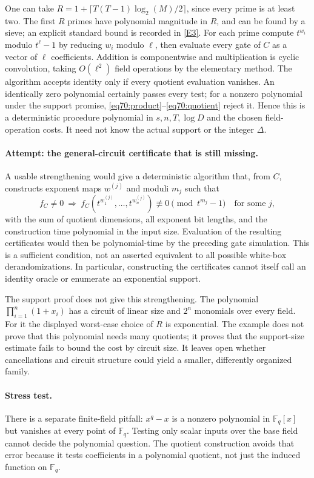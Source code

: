 \documentclass[11pt,a4paper]{article}
\numberwithin{equation}{section}
\newcommand{\F}{\mathbb{F}}
\newcommand{\eref}[2]{\hyperlink{extra:#1:#2}{[E#2]}}
\begin{document}
One can take
$R=1+\lceil T(T-1)\log_2(M)/2\rceil$, since every prime is at least two.
The first $R$ primes have polynomial magnitude in $R$, and can be found by
a sieve; an explicit standard bound is recorded in \eref{70}{3}.
For each prime compute $t^{w_i}$ modulo $t^\ell-1$ by reducing $w_i$
modulo $\ell$, then evaluate every gate of $C$ as a vector of $\ell$
coefficients. Addition is componentwise and multiplication is cyclic
convolution, taking $O(\ell^2)$ field operations by the elementary method.
The algorithm accepts identity only if every quotient evaluation vanishes.
An identically zero polynomial certainly passes every test; for a nonzero
polynomial under the support promise, \eqref{eq70:product}--\eqref{eq70:quotient}
reject it. Hence this is a deterministic procedure polynomial in
$s,n,T,\log D$ and the chosen field-operation costs. It need not know the
actual support or the integer $\Delta$.

\paragraph{Attempt: the general-circuit certificate that is still missing.}
A usable strengthening would give a deterministic algorithm that, from $C$,
constructs exponent maps $w^{(j)}$ and moduli $m_j$ such that
\[
 f_C\ne0\ \Longrightarrow\
 f_C(t^{w^{(j)}_1},\ldots,t^{w^{(j)}_n})
          \not\equiv0\pmod{t^{m_j}-1}\quad\text{for some }j,
\]
with the sum of quotient dimensions, all exponent bit lengths, and the
construction time polynomial in the input size. Evaluation of the resulting
certificates would then be polynomial-time by the preceding gate simulation.
This is a sufficient condition, not an asserted equivalent to all possible
white-box derandomizations. In particular, constructing the certificates
cannot itself call an identity oracle or enumerate an exponential support.

The support proof does not give this strengthening. The polynomial
$\prod_{i=1}^n(1+x_i)$ has a circuit of linear size and $2^n$ monomials
over every field. For it the displayed worst-case choice of $R$ is
exponential. The example does not prove that this polynomial needs many
quotients; it proves that the support-size estimate fails to bound the
cost by circuit size. It leaves open whether cancellations and circuit
structure could yield a smaller, differently organized family.

\paragraph{Stress test.}
There is a separate finite-field pitfall: $x^q-x$ is a nonzero polynomial
in $\F_q[x]$ but vanishes at every point of $\F_q$. Testing only scalar
inputs over the base field cannot decide the polynomial question. The
quotient construction avoids that error because it tests coefficients in
a polynomial quotient, not just the induced function on $\F_q$.
\end{document}
